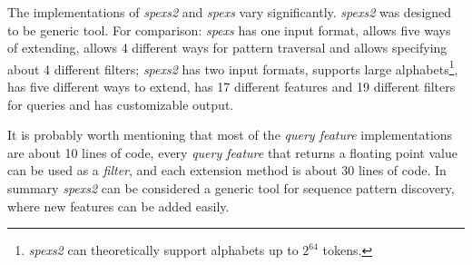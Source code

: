 The implementations of \emph{spexs2} and \emph{spexs} vary significantly. \emph{spexs2} was designed to be generic tool. For comparison: \emph{spexs} has one input format, allows five ways of extending, allows 4 different ways for pattern traversal and allows specifying about 4 different filters; \emph{spexs2} has two input formats, supports large alphabets\footnote{\emph{spexs2} can theoretically support alphabets up to $2^{64}$ tokens.}, has five different ways to extend, has 17 different features and 19 different filters for queries and has customizable output.

It is probably worth mentioning that most of the \emph{query feature} implementations are about 10 lines of code, every \emph{query feature} that returns a floating point value can be used as a \emph{filter}, and each extension method is about 30 lines of code. In summary \emph{spexs2} can be considered a generic tool for sequence pattern discovery, where new features can be added easily.